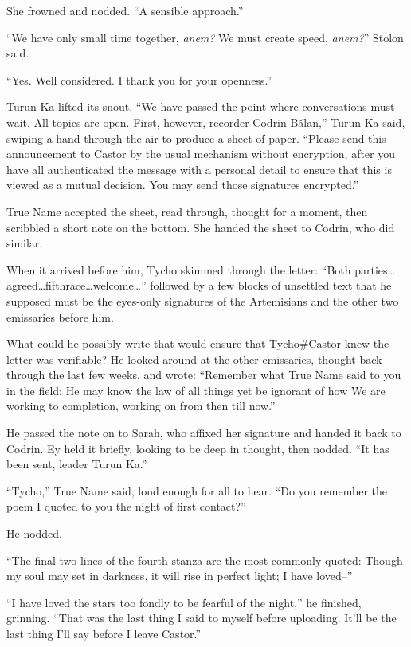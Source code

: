 She frowned and nodded. ``A sensible approach.''

``We have only small time together, \emph{anem?} We must create speed, \emph{anem?}'' Stolon said.

``Yes. Well considered. I thank you for your openness.''

Turun Ka lifted its snout. ``We have passed the point where conversations must wait. All topics are open. First, however, recorder Codrin Bălan,'' Turun Ka said, swiping a hand through the air to produce a sheet of paper. ``Please send this announcement to Castor by the usual mechanism without encryption, after you have all authenticated the message with a personal detail to ensure that this is viewed as a mutual decision. You may send those signatures encrypted.''

True Name accepted the sheet, read through, thought for a moment, then scribbled a short note on the bottom. She handed the sheet to Codrin, who did similar.

When it arrived before him, Tycho skimmed through the letter: ``Both parties\ldots agreed\ldots fifthrace\ldots welcome\ldots{}'' followed by a few blocks of unsettled text that he supposed must be the eyes-only signatures of the Artemisians and the other two emissaries before him.

What could he possibly write that would ensure that Tycho\#Castor knew the letter was verifiable? He looked around at the other emissaries, thought back through the last few weeks, and wrote: ``Remember what True Name said to you in the field: He may know the law of all things yet be ignorant of how We are working to completion, working on from then till now.''

He passed the note on to Sarah, who affixed her signature and handed it back to Codrin. Ey held it briefly, looking to be deep in thought, then nodded. ``It has been sent, leader Turun Ka.''

``Tycho,'' True Name said, loud enough for all to hear. ``Do you remember the poem I quoted to you the night of first contact?''

He nodded.

``The final two lines of the fourth stanza are the most commonly quoted: Though my soul may set in darkness, it will rise in perfect light; I have loved--''

``I have loved the stars too fondly to be fearful of the night,'' he finished, grinning. ``That was the last thing I said to myself before uploading. It'll be the last thing I'll say before I leave Castor.''

